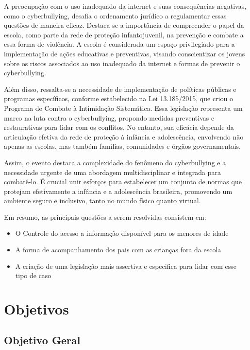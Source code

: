 A preocupação com o uso inadequado da internet e suas consequências negativas, como o cyberbullying, desafia o ordenamento jurídico a regulamentar essas questões de maneira eficaz. Destaca-se a importância de compreender o papel da escola, como parte da rede de proteção infantojuvenil, na prevenção e combate a essa forma de violência. A escola é considerada um espaço privilegiado para a implementação de ações educativas e preventivas, visando conscientizar os jovens sobre os riscos associados ao uso inadequado da internet e formas de prevenir o cyberbullying.

Além disso, ressalta-se a necessidade de implementação de políticas públicas e programas específicos, conforme estabelecido na Lei 13.185/2015, que criou o Programa de Combate à Intimidação Sistemática. Essa legislação representa um marco na luta contra o cyberbullying, propondo medidas preventivas e restaurativas para lidar com os conflitos. No entanto, sua eficácia depende da articulação efetiva da rede de proteção à infância e adolescência, envolvendo não apenas as escolas, mas também famílias, comunidades e órgãos governamentais.

Assim, o evento destaca a complexidade do fenômeno do cyberbullying e a necessidade urgente de uma abordagem multidisciplinar e integrada para combatê-lo. É crucial unir esforços para estabelecer um conjunto de normas que protejam efetivamente a infância e a adolescência brasileira, promovendo um ambiente seguro e inclusivo, tanto no mundo físico quanto virtual.

Em resumo, as principais questões a serem resolvidas consistem em: 
\begin{itemize}
    \item O Controle do acesso a informação disponível para os menores de idade
    \item A forma de acompanhamento dos pais com as crianças fora da escola
    \item A criação de uma legislação mais assertiva e especifica para lidar com esse tipo de caso
\end{itemize} 

\section{Objetivos}


\subsection{Objetivo Geral}

